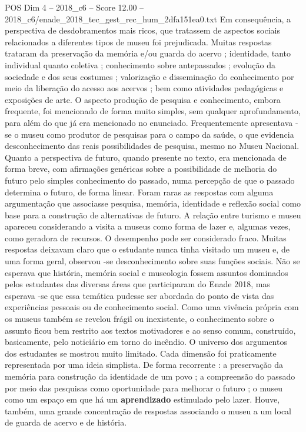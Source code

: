 \begin{textsample}{POS Dim 4 – 2018\_c6 – Score 12.00 – 2018\_c6/enade\_2018\_tec\_gest\_rec\_hum\_2dfa151ea0.txt}
Em consequência, a perspectiva de desdobramentos mais ricos, que tratassem de aspectos sociais relacionados a diferentes tipos de museu foi prejudicada.
Muitas respostas trataram da preservação da memória e/ou guarda do acervo ; identidade, tanto individual quanto coletiva ; conhecimento sobre antepassados ; evolução da sociedade e dos seus costumes ; valorização e disseminação do conhecimento por meio da liberação do acesso aos acervos ; bem como atividades pedagógicas e exposições de arte.
O aspecto produção de pesquisa e conhecimento, embora frequente, foi mencionado de forma muito simples, sem qualquer aprofundamento, para além do que já era mencionado no enunciado.
Frequentemente apresentava -se o museu como produtor de pesquisas para o campo da saúde, o que evidencia desconhecimento das reais possibilidades de pesquisa, mesmo no Museu Nacional.
Quanto a perspectiva de futuro, quando presente no texto, era mencionada de forma breve, com afirmações genéricas sobre a possibilidade de melhoria do futuro pelo simples conhecimento do passado, numa percepção de que o passado determina o futuro, de forma linear.
Foram raras as respostas com alguma argumentação que associasse pesquisa, memória, identidade e reflexão social como base para a construção de alternativas de futuro.
A relação entre turismo e museu apareceu considerando a visita a museus como forma de lazer e, algumas vezes, como geradora de recursos.
O desempenho pode ser considerado fraco.
Muitas respostas deixavam claro que o estudante nunca tinha visitado um museu e, de uma forma geral, observou -se desconhecimento sobre suas funções sociais.
Não se esperava que história, memória social e museologia fossem assuntos dominados pelos estudantes das diversas áreas que participaram do Enade 2018, mas esperava -se que essa temática pudesse ser abordada do ponto de vista das experiências pessoais ou de conhecimento social.
Como uma vivência própria com os museus também se revelou frágil ou inexistente, o conhecimento sobre o assunto ficou bem restrito aos textos motivadores e ao senso comum, construído, basicamente, pelo noticiário em torno do incêndio.
O universo dos argumentos dos estudantes se mostrou muito limitado.
Cada dimensão foi praticamente representada por uma ideia simplista.
De forma recorrente : a preservação da memória para construção da identidade de um povo ; a compreensão do passado por meio das pesquisas como oportunidade para melhorar o futuro ; o museu como um espaço em que há um \textbf{aprendizado} estimulado pelo lazer.
Houve, também, uma grande concentração de respostas associando o museu a um local de guarda de acervo e de história.

\end{textsample}
